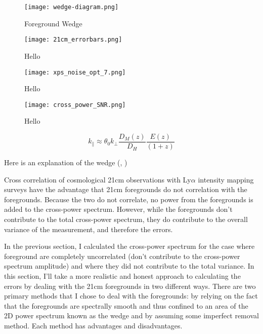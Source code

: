 \begin{figure}[ht]
	\centering
	\texttt{[image: wedge-diagram.png]}
	\caption[Foreground Wedge]{Foreground Wedge}
	\label{fig:wedge}
\end{figure}

\begin{figure}[th]
	\centering
	\texttt{[image: 21cm\_errorbars.png]}
	\caption[Noise Power Spectrum]{Hello}
	\label{fig:21cm_errors}
\end{figure}

\begin{figure}[th]
	\centering
	\texttt{[image: xps\_noise\_opt\_7.png]}
	\caption[Cross Terms Contribution to Noise]{Hello}
	\label{fig:xps_noise_contr}
\end{figure}

\begin{figure}[th]
	\centering
	\texttt{[image: cross\_power\_SNR.png]}
	\caption[Cross Power Spec SNR]{Hello}
	\label{fig:snr}
\end{figure}

\begin{equation}
    k_{\parallel} \approx \theta_{0} k_{\perp} \frac{D_{M} \left( z \right) }{D_H} \frac{E \left( z \right)}{\left(1 + z\right)}
\end{equation}

Here is an explanation of the wedge (\cite{2010ApJ...724..526D}, \cite{2012ApJ...752..137M})

Cross correlation of cosmological 21cm observations with Ly$\alpha$ intensity
mapping surveys have the advantage that 21cm foregrounds do not correlation with
the foregrounds. Because the two do not correlate, no power from the foregrounds
is added to the cross-power spectrum. However, while the foregrounds don't contribute
to the total cross-power spectrum, they do contribute to the overall variance
of the measurement, and therefore the errors.

In the previous section, I calculated the cross-power spectrum for the case where
foreground are completely uncorrelated (don't contribute to the cross-power spectrum
amplitude) and where they did not contribute to the total variance. In this section,
I'll take a more realistic and honest approach to calculating the errors by dealing
with the 21cm foregrounds in two different ways. There are two primary methods
that I chose to deal with the foregrounds: by relying on the fact that the foregrounds
are spectrally smooth and thus confined to an area of the 2D power spectrum known
as the wedge and by assuming some imperfect removal method. Each method has advantages
and disadvantages.

